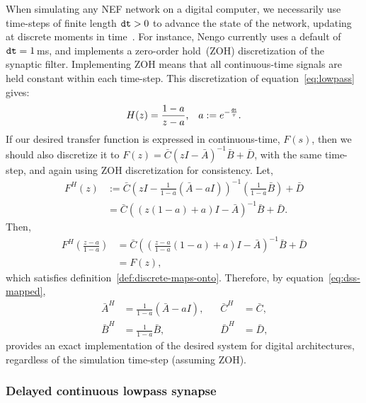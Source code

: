 When simulating any NEF network on a digital computer, we necessarily use time-steps of finite length $\texttt{dt}{} > 0$ to advance the state of the network, updating at discrete moments in time~\citep{bekolay2014}.
For instance, Nengo currently uses a default of $\texttt{dt}{} = 1$\,ms, and implements a zero-order hold~(ZOH) discretization of the synaptic filter.
Implementing ZOH means that all continuous-time signals are held constant within each time-step.
This discretization of equation~\ref{eq:lowpass} gives:
\begin{equation}
H(z) = \frac{1 - a}{z - a} \text{,} \quad a := e^{-\frac{\texttt{dt}{}}{\tau}} \text{.} \nonumber
\end{equation}
If our desired transfer function is expressed in continuous-time, $F(s)$, then we should also discretize it to $F(z) = \bar{C} (zI - \bar{A})^{-1} \bar{B} + \bar{D}$, with the same time-step, and again using ZOH discretization for consistency.
Let,
\begin{align*}
F^H(z) &:= \bar{C} \left(zI - \frac{1}{1 - a} \left(\bar{A} - aI \right) \right)^{-1} \left( \frac{1}{1-a}\bar{B} \right) + \bar{D} \\
&= \bar{C} \left( \left(z(1 - a) + a \right)I - \bar{A} \right)^{-1}\bar{B} + \bar{D} \text{.}
\end{align*}
Then, 
\begin{align*}
F^H \left( \frac{z-a}{1-a} \right) &= \bar{C}\left( \left( \frac{z-a}{1-a}(1 - a) + a \right)I - \bar{A} \right)^{-1}\bar{B} + \bar{D} \\
&= F(z) \text{,}
\end{align*}
which satisfies definition~\ref{def:discrete-maps-onto}.
Therefore, by equation~\ref{eq:dss-mapped},\begin{equation} \label{eq:discrete-p3}
\begin{aligned}
\bar{A}^H &= \frac{1}{1 - a} \left(\bar{A} - aI\right) \text{,} & \quad \bar{C}^H &= \bar{C} \text{,} \\
\bar{B}^H &= \frac{1}{1-a}\bar{B} \text{,} & \quad \bar{D}^H &= \bar{D} \text{,}
\end{aligned}
\end{equation}
provides an exact implementation of the desired system for digital architectures, regardless of the simulation time-step (assuming ZOH).

\subsubsection{Delayed continuous lowpass synapse}

